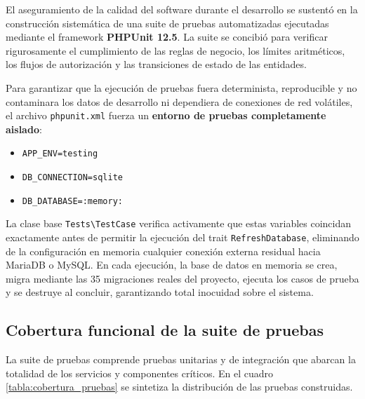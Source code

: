 El aseguramiento de la calidad del software durante el desarrollo se sustentó en la construcción sistemática de una suite de pruebas automatizadas ejecutadas mediante el framework \textbf{PHPUnit 12.5}. La suite se concibió para verificar rigurosamente el cumplimiento de las reglas de negocio, los límites aritméticos, los flujos de autorización y las transiciones de estado de las entidades.

Para garantizar que la ejecución de pruebas fuera determinista, reproducible y no contaminara los datos de desarrollo ni dependiera de conexiones de red volátiles, el archivo \texttt{phpunit.xml} fuerza un \textbf{entorno de pruebas completamente aislado}:
\begin{itemize}
    \item \texttt{APP\_ENV=testing}
    \item \texttt{DB\_CONNECTION=sqlite}
    \item \texttt{DB\_DATABASE=:memory:}
\end{itemize}

La clase base \texttt{Tests\textbackslash TestCase} verifica activamente que estas variables coincidan exactamente antes de permitir la ejecución del trait \texttt{RefreshDatabase}, eliminando de la configuración en memoria cualquier conexión externa residual hacia MariaDB o MySQL. En cada ejecución, la base de datos en memoria se crea, migra mediante las 35 migraciones reales del proyecto, ejecuta los casos de prueba y se destruye al concluir, garantizando total inocuidad sobre el sistema.

\subsection{Cobertura funcional de la suite de pruebas}
\label{sec:cobertura_pruebas}

La suite de pruebas comprende pruebas unitarias y de integración que abarcan la totalidad de los servicios y componentes críticos. En el cuadro \ref{tabla:cobertura_pruebas} se sintetiza la distribución de las pruebas construidas.

